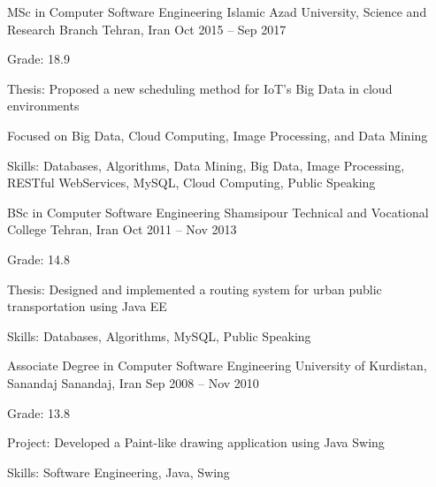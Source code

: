 
\begin{cventries}

  \cventry
    {MSc in Computer Software Engineering} %
    {Islamic Azad University, Science and Research Branch} %
    {Tehran, Iran} %
    {Oct 2015 -- Sep 2017} %
    {
      \begin{cvitems}
        \item {Grade: 18.9}
        \item {Thesis: Proposed a new scheduling method for IoT’s Big Data in cloud environments}
        \item {Focused on Big Data, Cloud Computing, Image Processing, and Data Mining}
        \item {Skills: Databases, Algorithms, Data Mining, Big Data, Image Processing, RESTful WebServices, MySQL, Cloud Computing, Public Speaking}
      \end{cvitems}
    }

  \cventry
    {BSc in Computer Software Engineering} %
    {Shamsipour Technical and Vocational College} %
    {Tehran, Iran} %
    {Oct 2011 -- Nov 2013} %
    {
      \begin{cvitems}
        \item {Grade: 14.8}
        \item {Thesis: Designed and implemented a routing system for urban public transportation using Java EE}
        \item {Skills: Databases, Algorithms, MySQL, Public Speaking}
      \end{cvitems}
    }

  \cventry
    {Associate Degree in Computer Software Engineering} %
    {University of Kurdistan, Sanandaj} %
    {Sanandaj, Iran} %
    {Sep 2008 -- Nov 2010} %
    {
      \begin{cvitems}
        \item {Grade: 13.8}
        \item {Project: Developed a Paint-like drawing application using Java Swing}
        \item {Skills: Software Engineering, Java, Swing}
      \end{cvitems}
    }

\end{cventries}

